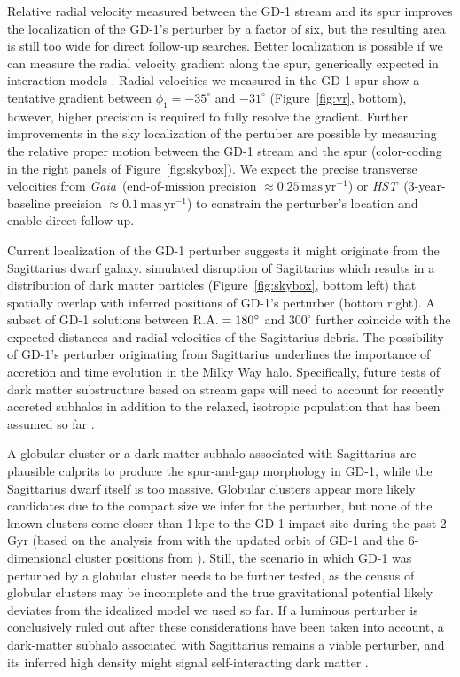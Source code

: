 \documentclass[twocolumn]{aastex63}
\newcommand{\gaia}{\textsl{Gaia}}
\newcommand{\hst}{\textsl{HST}}
\newcommand{\masyr}{\ensuremath{\textrm{mas}\,\textrm{yr}^{-1}}}
\begin{document}
Relative radial velocity measured between the GD-1 stream and its spur improves the localization of the GD-1's perturber by a factor of six, but the resulting area is still too wide for direct follow-up searches.
Better localization is possible if we can measure the radial velocity gradient along the spur, generically expected in interaction models \citep{bonaca2019a}.
Radial velocities we measured in the GD-1 spur show a tentative gradient between $\phi_1=-35^\circ$ and $-31^\circ$ (Figure~\ref{fig:vr}, bottom), however, higher precision is required to fully resolve the gradient.
Further improvements in the sky localization of the pertuber are possible by measuring the relative proper motion between the GD-1 stream and the spur (color-coding in the right panels of Figure~\ref{fig:skybox}).
We expect the precise transverse velocities from \gaia\ (end-of-mission precision $\approx0.25\,\masyr$) or \hst\ (3-year-baseline precision $\approx0.1\,\masyr$) to constrain the perturber's location and enable direct follow-up.

Current localization of the GD-1 perturber suggests it might originate from the Sagittarius dwarf galaxy.
\citet{dl2017} simulated disruption of Sagittarius which results in a distribution of dark matter particles (Figure~\ref{fig:skybox}, bottom left) that spatially overlap with inferred positions of GD-1's perturber (bottom right).
A subset of GD-1 solutions between $\rm R.A.=180^\circ$ and $300^\circ$ further coincide with the expected distances and radial velocities of the Sagittarius debris.
The possibility of GD-1's perturber originating from Sagittarius underlines the importance of accretion and time evolution in the Milky Way halo.
Specifically, future tests of dark matter substructure based on stream gaps will need to account for recently accreted subhalos in addition to the relaxed, isotropic population that has been assumed so far \citep[e.g.,][]{erkal2016, banik2019}.

A globular cluster or a dark-matter subhalo associated with Sagittarius are plausible culprits to produce the spur-and-gap morphology in GD-1, while the Sagittarius dwarf itself is too massive.
Globular clusters appear more likely candidates due to the compact size we infer for the perturber, but none of the known clusters come closer than 1\,kpc to the GD-1 impact site during the past 2\,Gyr (based on the analysis from \citealt{bonaca2019a} with the updated orbit of GD-1 and the 6-dimensional cluster positions from \citealt{baumgardt2019}).
Still, the scenario in which GD-1 was perturbed by a globular cluster needs to be further tested, as the census of globular clusters may be incomplete and the true gravitational potential likely deviates from the idealized model we used so far.
If a luminous perturber is conclusively ruled out after these considerations have been taken into account, a dark-matter subhalo associated with Sagittarius remains a viable perturber, and its inferred high density might signal self-interacting dark matter \citep[e.g.,][]{kahlhoefer2019}.
\end{document}
